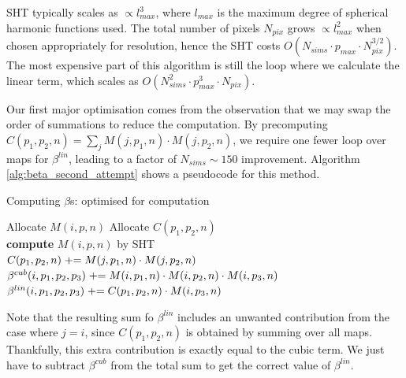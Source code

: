 SHT typically scales as $\propto l_{max}^3$, where $l_{max}$ is the maximum degree of spherical harmonic functions used. The total number of pixels $N_{pix}$ grows $\propto l_{max}^2$ when chosen appropriately for resolution, hence the SHT costs $O(N_{sims}\cdot p_{max} \cdot N_{pix}^{3/2})$. The most expensive part of this algorithm is still the loop where we calculate the linear term, which scales as $O(N_{sims}^2 \cdot p_{max}^3 \cdot N_{pix})$.

Our first major optimisation comes from the observation that we may swap the order of summations to reduce the computation. By precomputing $C(p_1, p_2, n) = \sum_j M(j,p_1,n) \cdot M(j,p_2,n)$, we require one fewer loop over maps for $\beta^{lin}$, leading to a factor of $N_{sims}\sim150$ improvement. Algorithm \ref{alg:beta_second_attempt} shows a pseudocode for this method.

\begin{algorithm}[htbp]
	\caption{Computing $\beta$s: optimised for computation}
	\label{alg:beta_second_attempt}
	\begin{algorithmic}[1] %
		\State Allocate $M(i,p,n)$ 
		\State Allocate $C(p_1,p_2,n)$ 
		\\
				\State \textbf{compute} $M(i,p,n)$ by SHT
			\EndFor
		\EndFor {}
		\\
					\State $C(p_1,p_2,n) \mathrel{+}= M(j,p_1,n) \cdot M(j,p_2,n)$
				\EndFor
			\EndFor
		\EndFor {}
		\\
					\State $\beta^{cub}(i, p_1, p_2, p_3) \mathrel{+}= M(i, p_1, n) \cdot M(i, p_2, n) \cdot M(i, p_3, n)$
					\State $\beta^{lin}(i, p_1, p_2, p_3) \mathrel{+}= C(p_1, p_2, n) \cdot M(i, p_3, n)$
				\EndFor
			\EndFor
		\EndFor
	\end{algorithmic}
\end{algorithm}

Note that the resulting sum fo $\beta^{lin}$ includes an unwanted contribution from the case where $j=i$, since $C(p_1,p_2,n)$ is obtained by summing over all maps. Thankfully, this extra contribution is exactly equal to the cubic term. We just have to subtract $\beta^{cub}$ from the total sum to get the correct value of $\beta^{lin}$.

